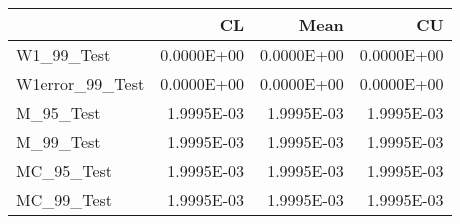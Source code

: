 \begin{tabular}{lrrr}
\toprule
{} &         CL &       Mean &         CU \\
\midrule
W1\_99\_Test      & 0.0000E+00 & 0.0000E+00 & 0.0000E+00 \\
W1error\_99\_Test & 0.0000E+00 & 0.0000E+00 & 0.0000E+00 \\
M\_95\_Test       & 1.9995E-03 & 1.9995E-03 & 1.9995E-03 \\
M\_99\_Test       & 1.9995E-03 & 1.9995E-03 & 1.9995E-03 \\
MC\_95\_Test      & 1.9995E-03 & 1.9995E-03 & 1.9995E-03 \\
MC\_99\_Test      & 1.9995E-03 & 1.9995E-03 & 1.9995E-03 \\
\bottomrule
\end{tabular}
